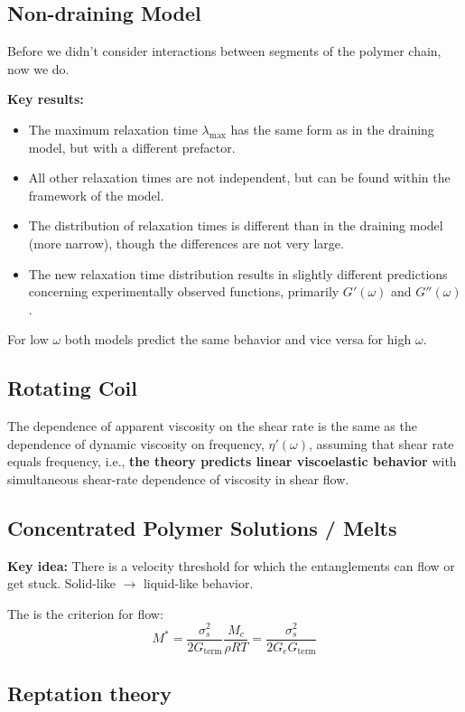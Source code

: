 \subsection{Non-draining Model}
Before we didn't consider interactions between segments of the polymer chain, now we do.

\textbf{Key results:}
\begin{itemize}
	\item The maximum relaxation time $\lambda_\text{max}$ has the same form as in the draining model, but with a different prefactor.
	\item All other relaxation times are not independent, but can be found within the framework of the model.
	\item The distribution of relaxation times is different than in the draining model (more narrow), though the differences are not very large.
	\item The new relaxation time distribution results in slightly different predictions concerning experimentally observed functions, primarily $G'(\omega)$ and $G''(\omega)$.
\end{itemize}
For low $\omega$ both models predict the same behavior and vice versa for high $\omega$.

\subsection{Rotating Coil}
The dependence of apparent viscosity on the shear rate is the same as the dependence of dynamic viscosity on frequency, $\eta'(\omega)$, assuming that shear rate equals frequency, i.e., \textbf{the theory predicts linear viscoelastic behavior} with simultaneous shear-rate dependence of viscosity in shear flow.

\subsection{Concentrated Polymer Solutions / Melts}
\textbf{Key idea:} There is a velocity threshold for which the entanglements can flow or get stuck. Solid-like $\to$ liquid-like behavior.

The is the criterion for flow:
\[
	M^* = \frac{\sigma_s^2}{2 G_\text{term}}\frac{M_c}{\rho RT}
	    = \frac{\sigma_s^2}{2 G_e G_\text{term}}
\]

\subsection{Reptation theory}

